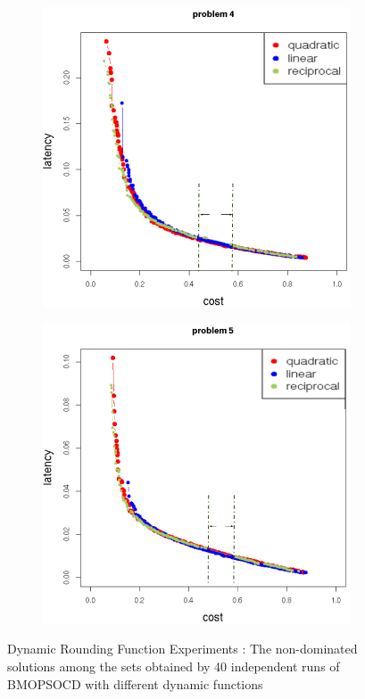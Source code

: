 \begin{figure}[h!]
\begin{subfigure}{0.49\textwidth}
	   \caption{}
   \end{subfigure}
   \begin{subfigure}{0.49\textwidth}
       \includegraphics[width=\textwidth]{pics/dynamic_problem_4.png}
	   \caption{}
   \end{subfigure}
   \begin{subfigure}{0.49\textwidth}
       \includegraphics[width=\textwidth]{pics/dynamic_problem_5.png}
	   \caption{}
   \end{subfigure}
   \caption{Dynamic Rounding Function Experiments : The non-dominated solutions among the sets obtained by 40 independent runs of BMOPSOCD with different dynamic functions}
   \label{fig:dynamicFunctions}
\end{figure}


